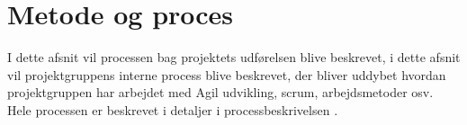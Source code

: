 \chapter{Metode og proces}
\label{cha:method-and-process}

I dette afsnit vil processen bag projektets udførelsen blive beskrevet, i dette afsnit vil projektgruppens interne process blive beskrevet, der bliver uddybet hvordan projektgruppen har arbejdet med Agil udvikling, scrum, arbejdsmetoder osv. Hele processen er beskrevet i detaljer i processbeskrivelsen .

